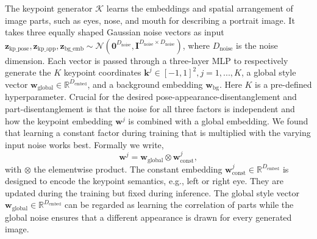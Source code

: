 \documentclass[10pt, conference, compsocconf]{IEEEtran}
\newcommand{\myR}{\mathbb{R}}
\newcommand{\vk}{\mathbf{k}}
\newcommand{\vw}{\mathbf{w}}
\newcommand{\vz}{\mathbf{z}}
\newcommand{\mI}{\mathbf{I}}
\newcommand{\cK}{\mathcal K}
\begin{document}
The keypoint generator $\cK$ learns the embeddings and spatial arrangement of image parts, such as eyes, nose, and mouth for describing a portrait image. 
It takes three equally shaped Gaussian noise vectors as input $\vz_\text{kp\_pose},\vz_\text{kp\_app}, \vz_\text{bg\_emb} \sim \mathcal N(\mathbf 0^{D_\text{noise}}, \mI^{D_\text{noise}\times D_\text{noise}})$, where $D_\text{noise}$ is the noise dimension. Each vector is passed through a three-layer MLP to respectively 
generate the $K$ keypoint coordinates $\vk^j\in[-1,1]^2, j=1,...,K$, a global style vector $\vw_\text{global}\in\myR^{D_\text{embed}}$, and a background embedding $\vw_\text{bg}$.
Here $K$ is a pre-defined hyperparameter.
Crucial for the desired pose-appearance-disentanglement and part-disentanglement is that the noise for all three factors is independent and how the keypoint embedding $\vw^j$ is combined with a global embedding. We found that learning a constant factor during training that is multiplied with the varying input noise works best. Formally we write,
\begin{equation}
    \vw^j=\vw_\text{global} \otimes \vw^j_\text{const},
    \label{eq:noise combination}
\end{equation}
with $\otimes$ the elementwise product. The constant embedding $\vw^j_\text{const}\in\myR^{D_\text{embed}}$ is designed to
encode the keypoint semantics, e.g., left or right eye. They are updated during the training but fixed during inference. The
global style vector $\vw_\text{global}\in\myR^{D_\text{embed}}$ can be regarded as 
learning the correlation of parts while the global noise ensures that a different appearance is drawn for every generated image. 
\end{document}
